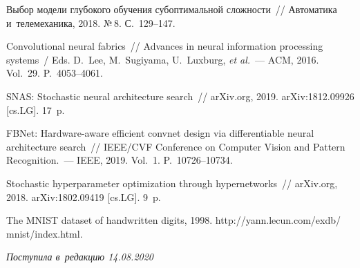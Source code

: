 \begin{multicols}{2}
{{\begin{thebibliography}{9}
Выбор модели глубокого обучения субоптимальной сложности~//
Автоматика и~телемеханика, 2018. №\,8. С.~129--147.
    
   Convolutional neural fabrics~// Advances 
in neural information processing systems~/ Eds. D.~Lee, M.~Sugiyama, U.~Luxburg, \textit{et al.}~---
ACM, 2016. Vol.~29. P.~4053--4061.
    
    
   SNAS: Stochastic neural 
architecture search~// arXiv.org, 2019. arXiv:1812.09926 [cs.LG]. 17~p.
    
    FBNet: Hardware-aware efficient convnet design 
via differentiable neural architecture search~// IEEE/CVF Conference on 
Computer Vision and Pattern Recognition.~--- IEEE, 2019. Vol.~1. P.~10726--10734.
    
    Stochastic hyperparameter optimization 
through hypernetworks~// arXiv.org, 2018. \mbox{arXiv}:1802.09419 [cs.LG]. 9~p.

    The MNIST dataset of 
handwritten digits, 1998. {\sf http://yann.lecun.com/exdb/ mnist/index.html}.
\end{thebibliography}

}
}

\end{multicols}

\vspace*{-3pt}

\hfill{\small\textit{Поступила в~редакцию 14.08.2020}}



\newpage

\vspace*{-28pt}





\def\tit{VARIATIONAL DEEP LEARNING MODEL OPTIMIZATION WITH~COMPLEXITY CONTROL}

